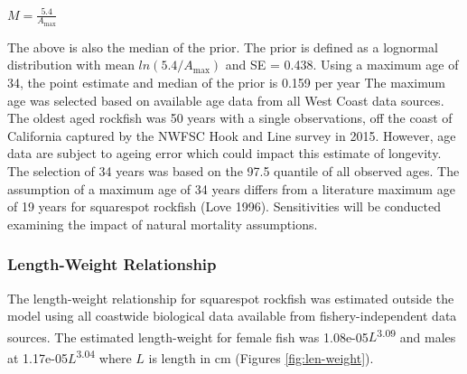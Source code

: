 \documentclass[11pt,
  english,
  a4paper,
]{article}
\begin{document}
\leavevmode\tagmcend\tagstructend\par

\begin{centering}

$M=\frac{5.4}{A_{\text{max}}}$

\end{centering}


The above is also the median of the prior. The prior is defined as a lognormal distribution with mean {\(ln(5.4/A_{\text{max}})\)\leavevmode\tagmcend\tagstructend} and SE = 0.438. Using a maximum age of 34, the point estimate and median of the prior is 0.159 per year The maximum age was selected based on available age data from all West Coast data sources. The oldest aged rockfish was 50 years with a single observations, off the coast of California captured by the NWFSC Hook and Line survey in 2015. However, age data are subject to ageing error which could impact this estimate of longevity. The selection of 34 years was based on the 97.5 quantile of all observed ages. The assumption of a maximum age of 34 years differs from a literature maximum age of 19 years for squarespot rockfish {(Love 1996)\leavevmode\tagmcend\tagstructend}. Sensitivities will be conducted examining the impact of natural mortality assumptions.

\leavevmode\tagmcend\tagstructend\par


\hypertarget{length-weight-relationship}{%
\subsubsection{Length-Weight Relationship}\label{length-weight-relationship}}

\leavevmode\tagmcend\tagstructend


The length-weight relationship for squarespot rockfish was estimated outside the model using all coastwide biological data available from fishery-independent data sources. The estimated length-weight for female fish was 1.08e-05{\(L\)\leavevmode\tagmcend\tagstructend}\textsuperscript{3.09} and males at 1.17e-05{\(L\)\leavevmode\tagmcend\tagstructend}\textsuperscript{3.04} where {\(L\)\leavevmode\tagmcend\tagstructend} is length in cm (Figures \ref{fig:len-weight}).
\end{document}
